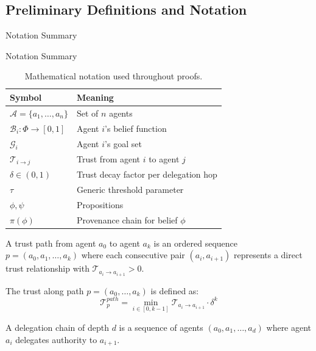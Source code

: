 \documentclass[
  ignorenonframetext,
]{beamer}
\begin{document}
\subsection{Preliminary Definitions and
Notation}\label{sec:preliminaries}

\begin{frame}[allowframebreaks]{Notation Summary}
\protect{}\label{sec:notation}
\end{frame}

\begin{frame}[allowframebreaks]{Notation Summary}
\begin{table}[htbp]
\centering
\caption{Mathematical notation used throughout proofs.}
\label{tab:notation}
\begin{tabular}{@{}ll@{}}
\toprule
Symbol & Meaning \\
\midrule
$\mathcal{A} = \{a_1, \ldots, a_n\}$ & Set of $n$ agents \\
$\mathcal{B}_i: \Phi \to [0,1]$ & Agent $i$'s belief function \\
$\mathcal{G}_i$ & Agent $i$'s goal set \\
$\mathcal{T}_{i \to j}$ & Trust from agent $i$ to agent $j$ \\
$\delta \in (0,1)$ & Trust decay factor per delegation hop \\
$\tau$ & Generic threshold parameter \\
$\phi, \psi$ & Propositions \\
$\pi(\phi)$ & Provenance chain for belief $\phi$ \\
\bottomrule
\end{tabular}
\end{table}

\begin{definition}
\label{def:trust-path}
A trust path from agent $a_0$ to agent $a_k$ is an ordered sequence $p = (a_0, a_1, \ldots, a_k)$ where each consecutive pair $(a_i, a_{i+1})$ represents a direct trust relationship with $\mathcal{T}_{a_i \to a_{i+1}} > 0$.
\end{definition}

\begin{definition}
\label{def:path-trust}
The trust along path $p = (a_0, \ldots, a_k)$ is defined as:
\begin{equation}
\label{eq:path-trust}
\mathcal{T}^{path}_p = \min_{i \in [0,k-1]} \mathcal{T}_{a_i \to a_{i+1}} \cdot \delta^{k}
\end{equation}
\end{definition}

\begin{definition}
\label{def:delegation-chain}
A delegation chain of depth $d$ is a sequence of agents $(a_0, a_1, \ldots, a_d)$ where agent $a_i$ delegates authority to $a_{i+1}$.
\end{definition}
\end{frame}
\end{document}
